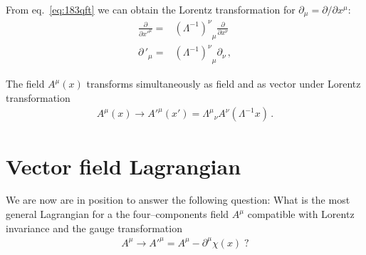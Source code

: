 From eq.~\eqref{eq:183qft} we can obtain the Lorentz transformation for $\partial_\mu=\partial/\partial x^\mu$:
\begin{align}
  \label{dmulrtran}
   \frac{\partial}{{\partial x'}^\mu}=& {\left(\Lambda^{-1}\right)^\nu}_\mu\frac{\partial}{\partial x^\nu}\nonumber\\
   {\partial\,}'_\mu=& {\left(\Lambda^{-1}\right)^\nu}_\mu\partial_\nu\,,
\end{align}

The field $A^\mu(x)$ transforms simultaneously as field and as vector under Lorentz transformation
\begin{align}
  A^\mu(x)\to {A'}^\mu(x')={\Lambda^\mu}_\nu A^\nu(\Lambda^{-1}x)\,.
\end{align}


\section{Vector field Lagrangian}

We are now are in position to answer the following question: What is the most general Lagrangian for a the four--components field $A^\mu$ compatible with Lorentz invariance and the gauge transformation
\begin{align}
\label{eq:172qft}
  A^\mu\to{A'}^\mu=A^\mu-\partial^\mu\chi(x)\;?
\end{align}




